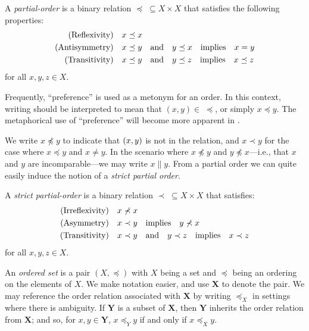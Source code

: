\begin{definition}
	\label{definition:partial-order}

	A \textit{partial-order}  is a binary relation $\preceq \; \subseteq X \times X$ that satisfies the
	following properties:
	\begin{align}
		\text{(Reflexivity)}\quad  & x \preceq x                                      \\
		\text{(Antisymmetry)}\quad & x \preceq y \quad \text{and} \quad y \preceq x \quad \text{implies} \quad x = y       \\
		\text{(Transitivity)}\quad & x \preceq y \quad \text{and} \quad y \preceq z \quad \text{implies} \quad x \preceq z
	\end{align}
	for all $x,y,z \in X$.
\end{definition}

Frequently, ``preference'' is used as a metonym for an order. In this context, writing 
should be interpreted to mean that $(x, y) \in \; \preceq$, or simply $x \preceq y$. The metaphorical use of ``preference''
will become more apparent in .

We write $x \npreceq y$ to indicate that $(x,y)$ is not in the relation, and $x \prec y$ for the case where $x\preceq
y$ and $x \not = y$. In the scenario where $x \not \preceq y$ and $y \not \preceq x$---i.e., that $x$ and $y$ are
incomparable---we may write $x \parallel y$. From a partial order we can quite easily induce the notion of a \emph{strict
partial order}.

\begin{definition}
	\label{definition:strict-partial-order} A \textit{strict partial-order}  is
	a binary relation $\prec \; \subseteq X \times X$ that satisfies:
	\begin{align}
		\text{(Irreflexivity)}\quad & x \nprec x                                 \\
		\text{(Asymmetry)}\quad     & x \prec y \quad \text{implies} \quad y \nprec x                \\
		\text{(Transitivity)}\quad  & x \prec y \quad \text{and} \quad y \prec z \quad \text{implies} \quad x \prec z
	\end{align}
	for all $x,y,z \in X$.
\end{definition}

An \textit{ordered set} is a pair $(X, \preceq)$ with $X$ being a set and $\preceq$ being an ordering on the elements of
$X$. We make notation easier, and use $\mathbf{X}$ to denote the pair. We may reference the order relation associated with
$\mathbf{X}$ by writing $\preceq_{X}$ in settings where there is ambiguity. If $\mathbf{Y}$ is a subset of $\mathbf{X}$,
then $\mathbf{Y}$ inherits the order relation from $\mathbf{X}$; and so, for $x,y \in \mathbf{Y}$, $x \preceq_{Y}y$ if
and only if $x \preceq_{X}y$. 


